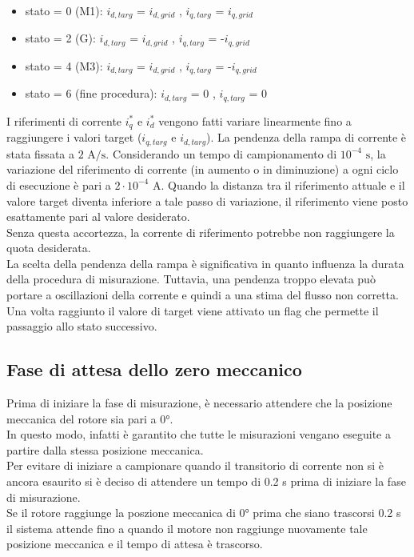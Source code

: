 \begin{itemize}
    \item stato = 0 (M1): $i_{d,targ}$ = $i_{d,grid}$ , $i_{q,targ}$ = $i_{q,grid}$
    \item stato = 2 (G): $i_{d,targ}$ = $i_{d,grid}$ , $i_{q,targ}$ = -$i_{q,grid}$
    \item stato = 4 (M3): $i_{d,targ}$ = $i_{d,grid}$ , $i_{q,targ}$ = -$i_{q,grid}$
    \item stato = 6 (fine procedura): $i_{d,targ}$ = 0 , $i_{q,targ}$ = 0
\end{itemize}

I riferimenti di corrente $i_q^*$ e $i_d^*$ vengono fatti variare linearmente fino a raggiungere i valori target ($i_{q,targ}$ e $i_{d,targ}$).
La pendenza della rampa di corrente è stata fissata a $2\text{ A/s}$. Considerando un tempo di campionamento di $10^{-4}\text{ s}$, la variazione del riferimento di corrente (in aumento o in diminuzione) a ogni ciclo di esecuzione è pari a $2 \cdot 10^{-4}\text{ A}$. Quando la distanza tra il riferimento attuale e il valore target diventa inferiore a tale passo di variazione, il riferimento viene posto esattamente pari al valore desiderato.\\
Senza questa accortezza, la corrente di riferimento potrebbe non raggiungere la quota desiderata.\\
La scelta della pendenza della rampa è significativa in quanto influenza la durata della procedura di misurazione. Tuttavia, una pendenza troppo elevata può portare a oscillazioni della corrente e quindi a una stima del flusso non corretta.\\
Una volta raggiunto il valore di target viene attivato un flag che permette il passaggio allo stato successivo.


\subsection{Fase di attesa dello zero meccanico}
Prima di iniziare la fase di misurazione, è necessario attendere che la posizione meccanica del rotore sia pari a 0°.\\
In questo modo, infatti è garantito che tutte le misurazioni vengano eseguite a partire dalla stessa posizione meccanica.\\
Per evitare di iniziare a campionare quando il transitorio di corrente non si è ancora esaurito si è deciso di attendere un tempo di 0.2 s prima di iniziare la fase di misurazione.\\
Se il rotore raggiunge la poszione meccanica di 0° prima che siano trascorsi 0.2 s il sistema attende fino a quando il motore non raggiunge nuovamente tale posizione meccanica e il tempo di attesa è trascorso.

